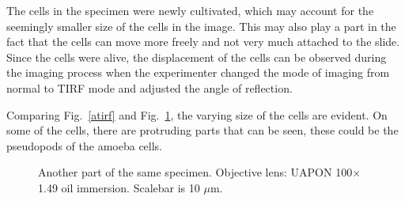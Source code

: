 The cells in the specimen were newly cultivated, which may account for the seemingly smaller size of the cells in the image. 
This may also play a part in the fact that the cells can move more freely and not very much attached to the slide. 
Since the cells were alive, the displacement of the cells can be observed during the imaging process when the experimenter changed the mode of imaging from normal to TIRF mode and adjusted the angle of reflection.

Comparing Fig.~\ref{atirf} and Fig.~\ref{fig:amoebatirfb}, the varying size of the cells are evident. 
On some of the cells, there are protruding parts that can be seen, these could be the pseudopods of the amoeba cells.

\begin{figure}[h]
\centering
{}
\caption{Another part of the same specimen. 
Objective lens: UAPON 100$\times$ 1.49 oil immersion. 
Scalebar is 10 $\mu$m.}
\label{fig:amoebatirfb}
\end{figure}
 



%



